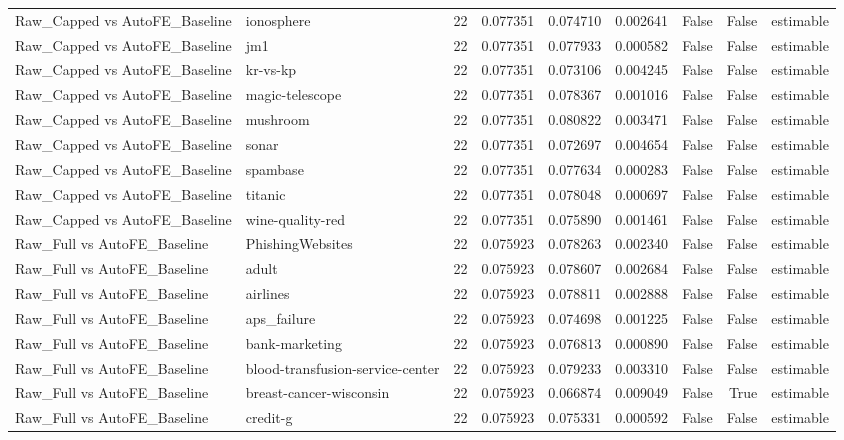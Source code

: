 \begin{table}
\begin{tabular}{llrrrrrrl}
Raw\_Capped vs AutoFE\_Baseline & ionosphere & 22 & 0.077351 & 0.074710 & 0.002641 & False & False & estimable \\
Raw\_Capped vs AutoFE\_Baseline & jm1 & 22 & 0.077351 & 0.077933 & 0.000582 & False & False & estimable \\
Raw\_Capped vs AutoFE\_Baseline & kr-vs-kp & 22 & 0.077351 & 0.073106 & 0.004245 & False & False & estimable \\
Raw\_Capped vs AutoFE\_Baseline & magic-telescope & 22 & 0.077351 & 0.078367 & 0.001016 & False & False & estimable \\
Raw\_Capped vs AutoFE\_Baseline & mushroom & 22 & 0.077351 & 0.080822 & 0.003471 & False & False & estimable \\
Raw\_Capped vs AutoFE\_Baseline & sonar & 22 & 0.077351 & 0.072697 & 0.004654 & False & False & estimable \\
Raw\_Capped vs AutoFE\_Baseline & spambase & 22 & 0.077351 & 0.077634 & 0.000283 & False & False & estimable \\
Raw\_Capped vs AutoFE\_Baseline & titanic & 22 & 0.077351 & 0.078048 & 0.000697 & False & False & estimable \\
Raw\_Capped vs AutoFE\_Baseline & wine-quality-red & 22 & 0.077351 & 0.075890 & 0.001461 & False & False & estimable \\
Raw\_Full vs AutoFE\_Baseline & PhishingWebsites & 22 & 0.075923 & 0.078263 & 0.002340 & False & False & estimable \\
Raw\_Full vs AutoFE\_Baseline & adult & 22 & 0.075923 & 0.078607 & 0.002684 & False & False & estimable \\
Raw\_Full vs AutoFE\_Baseline & airlines & 22 & 0.075923 & 0.078811 & 0.002888 & False & False & estimable \\
Raw\_Full vs AutoFE\_Baseline & aps\_failure & 22 & 0.075923 & 0.074698 & 0.001225 & False & False & estimable \\
Raw\_Full vs AutoFE\_Baseline & bank-marketing & 22 & 0.075923 & 0.076813 & 0.000890 & False & False & estimable \\
Raw\_Full vs AutoFE\_Baseline & blood-transfusion-service-center & 22 & 0.075923 & 0.079233 & 0.003310 & False & False & estimable \\
Raw\_Full vs AutoFE\_Baseline & breast-cancer-wisconsin & 22 & 0.075923 & 0.066874 & 0.009049 & False & True & estimable \\
Raw\_Full vs AutoFE\_Baseline & credit-g & 22 & 0.075923 & 0.075331 & 0.000592 & False & False & estimable \\

\end{tabular}
\end{table}
